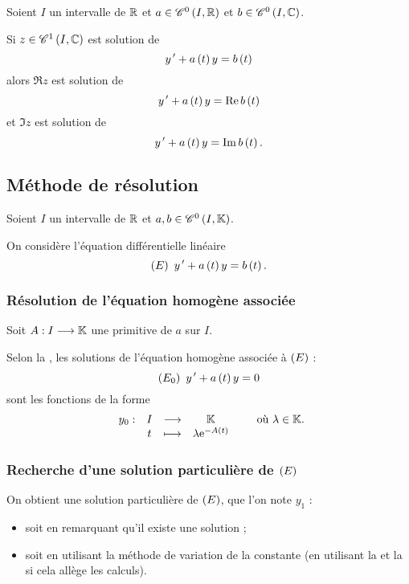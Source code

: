 \begin{dem}
\end{dem}

\begin{prop}
Soient \(I\) un intervalle de \(\mathbb{R}\) et \(a\in\mathscr{C}^{0}\left(I,\mathbb{R}\right)\) et \(b\in\mathscr{C}^{0}\left(I,\mathbb{C}\right)\).

Si \(z\in\mathscr{C}^{1}\left(I,\mathbb{C}\right)\) est solution de \[y^{\,\prime}+a\left(t\right)y=b\left(t\right)\] alors \(\Re z\) est solution de \[y^{\,\prime}+a\left(t\right)y=\operatorname{Re} b\left(t\right)\] et \(\Im z\) est solution de \[y^{\,\prime}+a\left(t\right)y=\operatorname{Im} b\left(t\right).\]
\end{prop}

\begin{dem}
\end{dem}

\subsection{Méthode de résolution}

Soient \(I\) un intervalle de \(\mathbb{R}\) et \(a,b\in\mathscr{C}^{0}\left(I,\mathbb{K}\right)\).

On considère l'équation différentielle linéaire \[\left(E\right)~y^{\,\prime}+a\left(t\right)y=b\left(t\right).\]

\subsubsection{Résolution de l'équation homogène associée}

Soit \(A:I\longrightarrow\mathbb{K}\) une primitive de \(a\) sur \(I\).

Selon la , les solutions de l'équation homogène associée à \(\left(E\right)\) : \[\left(E_0\right)~y^{\,\prime}+a\left(t\right)y=0\] sont les fonctions de la forme \[\begin{array}[t]{cccc}y_0 : & I & \longrightarrow & \mathbb{K} \\ & t & \longmapsto & \lambda\mathrm{e}^{-A\left(t\right)}\end{array}\qquad\text{où }\lambda\in\mathbb{K}.\]

\subsubsection{Recherche d'une solution particulière de \(\left(E\right)\)}

On obtient une solution particulière de \(\left(E\right)\), que l'on note \(y_1\) :

\begin{itemize}
\item soit en remarquant qu'il existe une solution  ; \\

\item soit en utilisant la méthode de variation de la constante (en utilisant la  et la  si cela allège les calculs).
\end{itemize}

